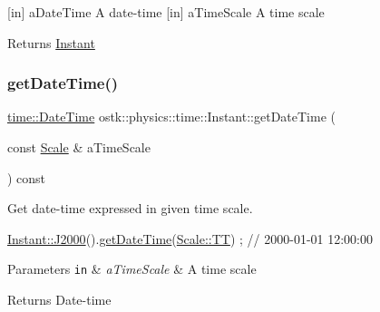 \mbox{[}in\mbox{]} a\+Date\+Time A date-\/time  \mbox{[}in\mbox{]} a\+Time\+Scale A time scale \begin{DoxyReturn}{Returns}
\hyperlink{classostk_1_1physics_1_1time_1_1_instant}{Instant} 
\end{DoxyReturn}
\mbox{\label{classostk_1_1physics_1_1time_1_1_instant_a3fccf9781f8466ce2163aa2396f70560}} 
\subsubsection{\texorpdfstring{get\+Date\+Time()}{getDateTime()}}
{\footnotesize\ttfamily \hyperlink{classostk_1_1physics_1_1time_1_1_date_time}{time\+::\+Date\+Time} ostk\+::physics\+::time\+::\+Instant\+::get\+Date\+Time (\begin{DoxyParamCaption}\item[{const \hyperlink{namespaceostk_1_1physics_1_1time_adf23d37bd8641fb76a0e98ab46a70df7}{Scale} \&}]{a\+Time\+Scale }\end{DoxyParamCaption}) const}



Get date-\/time expressed in given time scale. 


\begin{DoxyCode}
\hyperlink{classostk_1_1physics_1_1time_1_1_instant_a3f84d0c2d0b140326d3b172b54e3ffff}{Instant::J2000}().\hyperlink{classostk_1_1physics_1_1time_1_1_instant_a3fccf9781f8466ce2163aa2396f70560}{getDateTime}(\hyperlink{namespaceostk_1_1physics_1_1time_adf23d37bd8641fb76a0e98ab46a70df7adf1f3edb9115acb0a1e04209b7a9937b}{Scale::TT}) ; \textcolor{comment}{// 2000-01-01 12:00:00}
\end{DoxyCode}



\begin{DoxyParams}[1]{Parameters}
\mbox{\tt in}  & {\em a\+Time\+Scale} & A time scale \\
\hline
\end{DoxyParams}
\begin{DoxyReturn}{Returns}
Date-\/time 
\end{DoxyReturn}
\mbox{\label{classostk_1_1physics_1_1time_1_1_instant_a71b3a5992123fddb3a3539dc99df66c1}} 

